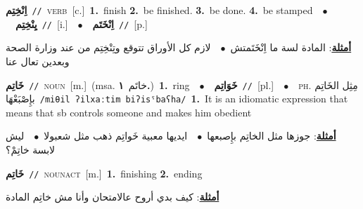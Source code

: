\documentclass[10pt,a4paper,twoside]{article} %
\begin{document}
\begin{multicols}{2}
{{{\setlength\topsep{0pt}\textbf{\foreignlanguage{arabic}{اِنْخِتِم}}\ {\color{gray}\texttt{//}\color{black}}\ \textsc{verb}\ [c.]\ \textbf{1.}~finish  \textbf{2.}~be finished.  \textbf{3.}~be done.  \textbf{4.}~be stamped\ \ $\bullet$\ \ \setlength\topsep{0pt}\textbf{\foreignlanguage{arabic}{يِنْخِتِم}}\ {\color{gray}\texttt{//}\color{black}}\ [i.]\ \ $\bullet$\ \ \setlength\topsep{0pt}\textbf{\foreignlanguage{arabic}{اِنْخَتَم}}\ {\color{gray}\texttt{//}\color{black}}\ [p.]\  \begin{flushright}\color{gray}\foreignlanguage{arabic}{\textbf{\underline{\foreignlanguage{arabic}{أمثلة}}}: المادة لسة ما اِنْخَتَمتش\ $\bullet$\ \  لازم كل الأوراق تتوقع وتِنْخِتِم من عند وزارة الصحة وبعدين تعال عنا}\end{flushright}\color{black}} \vspace{2mm}

{\setlength\topsep{0pt}\textbf{\foreignlanguage{arabic}{خَاتِم}}\ {\color{gray}\texttt{//}\color{black}}\ \textsc{noun}\ [m.]\ \color{gray}(msa. \foreignlanguage{arabic}{خاتَم}~\foreignlanguage{arabic}{\textbf{١.}})\color{black}\ \textbf{1.}~ring\ \ $\bullet$\ \ \setlength\topsep{0pt}\textbf{\foreignlanguage{arabic}{خَوَاتِم}}\ {\color{gray}\texttt{//}\color{black}}\ [pl.]\ \ $\bullet$\ \ \textsc{ph.} \color{gray} \foreignlanguage{arabic}{مِثِل الخَاتِم بإِصْبَعْهَا}\color{black}\ {\color{gray}\texttt{/{\sffamily miθil ʔilxaːtim biʔisˤbaʕha}/}\color{black}}\ \textbf{1.}~It is an idiomatic expression that means that sb controls someone and makes him obedient\  \begin{flushright}\color{gray}\foreignlanguage{arabic}{\textbf{\underline{\foreignlanguage{arabic}{أمثلة}}}: جوزها مثل الخاتِم بإِصبعها\ $\bullet$\ \  ايديها معبية خَواتِم ذهب مثل شعبولا\ $\bullet$\ \  ليش لابسة خاتِمْ؟}\end{flushright}\color{black}} \vspace{2mm}

{\setlength\topsep{0pt}\textbf{\foreignlanguage{arabic}{خَاتِم}}\ {\color{gray}\texttt{//}\color{black}}\ \textsc{noun\textunderscore act}\ [m.]\ \textbf{1.}~finishing  \textbf{2.}~ending\  \begin{flushright}\color{gray}\foreignlanguage{arabic}{\textbf{\underline{\foreignlanguage{arabic}{أمثلة}}}: كيف بدي أروح عالامتحان وأنا مش خاتِم المادة}\end{flushright}\color{black}} \vspace{2mm}

}}
\end{multicols}
\end{document}
